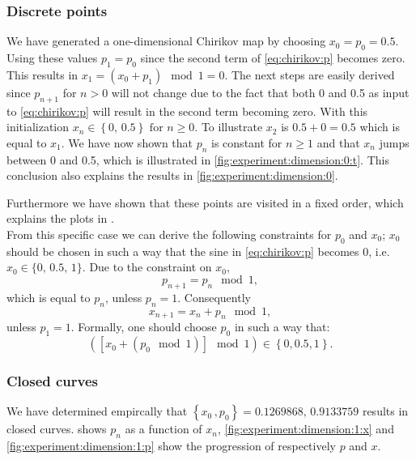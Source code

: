 	\subsubsection{Discrete points}
	We have generated a one-dimensional Chirikov map by choosing $x_0 = p_0 = 0.5$. Using these values $p_1 = p_0$ since the second term of \eqref{eq:chirikov:p} becomes zero. This results in $x_1 = \left( x_0 + p_{1} \right) \mod 1= 0$. The next steps are easily derived since $p_{n + 1}$ for $n > 0$ will not change due to the fact that both 0 and 0.5 as input to \eqref{eq:chirikov:p} will result in the second term becoming zero. With this initialization $x_{n} \in \left\{0,\, 0.5 \right\} \text{ for } n \geq 0$. To illustrate $x_2$ is $0.5 + 0 = 0.5$ which is equal to $x_1$. We have now shown that $p_n$ is constant for $n \geq 1$ and that $x_n$ jumps between 0 and 0.5, which is illustrated in \cref{fig:experiment:dimension:0:t}. This conclusion also explains the results in \cref{fig:experiment:dimension:0}. 

	Furthermore we have shown that these points are visited in a fixed order, which explains the plots in .\\

	From this specific case we can derive the following constraints for $p_0$ and $x_0$; $x_0$ should be chosen in such a way that the sine in \cref{eq:chirikov:p} becomes 0, i.e. $x_0 \in \{0,\, 0.5,\, 1\}$. Due to the constraint on $x_0$,
	\begin{equation*}
	p_{n + 1} = p_{n} \mod 1,
	\end{equation*}
 	which is equal to $p_n$, unless $p_n = 1$. Consequently
 	\begin{equation*}
 	x_{n + 1} = x_n + p_n \mod 1,
 	\end{equation*}
	unless $p_1 = 1$. Formally, one should choose $p_0$ in such a way that:
	\begin{equation*}
		\left( \left[ x_0 + (p_0 \mod 1)\right] \mod 1 \right) \in \left\{0, 0.5, 1\right\}.
	\end{equation*}

	\subsubsection{Closed curves}
	We have determined empircally that $\left\{x_0\,, p_0 \right\} = {\num{0.1269868},\,\num{0.9133759}}$ results in closed curves.  shows $p_n$ as a function of $x_n$, \cref{fig:experiment:dimension:1:x} and \ref{fig:experiment:dimension:1:p} show the progression of respectively $p$ and $x$.\\

